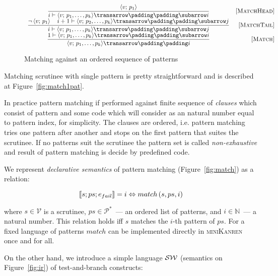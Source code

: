 \begin{figure}
   \renewcommand*{\arraystretch}{3}
   \setarrow{\xRightarrow}
   \setsubarrow{_*}
   \[
   \begin{array}{cr}
     \trule{\inbr{v;\,p_1}}
           {\withenv{i}{\trans{\inbr{v;\,p_1,\dots,p_k}}{}{i}}} & \ruleno{MatchHead}\\
     \trule{\neg\inbr{v;\,p_1}\quad\withenv{i+1}{\trans{\inbr{v;\,p_2,\dots,p_k}}{}{j}}}
           {\withenv{i}{\trans{\inbr{v;\,p_1,\dots,p_k}}{}{j}}} & \ruleno{MatchTail}\\
     \trule{\withenv{1}{\trans{\inbr{v;\,p_1,\dots,p_k}}{}{i}}}
           {\setsubarrow{}\trans{\inbr{v;\,p_1,\dots,p_k}}{}{i}} & \ruleno{Match}
   \end{array}
   \]
   \caption{Matching against an ordered sequence of patterns}
   \label{fig:matchpatts}
\end{figure}

Matching scrutinee with single pattern is pretty straightforward and is described at Figure~\ref{fig:match1pat}.

In practice pattern matching if performed against finite sequence of \emph{clauses} which consist of pattern and some code which will consider as an natural number equal to pattern index, for simplicity. The clauses are ordered, i.e. pattern matching tries one pattern after another and stops on the first pattern that suites the scrutinee. If no patterns suit the scrutinee the pattern set is called \emph{non-exhaustive} and result of pattern matching is decide by predefined code.   
 

We represent \emph{declarative semantics} of pattern matching (Figure~\ref{fig:match}) as a relation:
 
 \[
  \llbracket{s; ps; e_{fail}}\rrbracket = i \Leftrightarrow   match\, (s, ps, i)
 \]
 
 where $s\in\mathcal{V}$ is a scrutinee, $ps\in\mathcal{P}^*$~--- an ordered list of patterns, and $i\in\mathbb{N}$~--- a natural number.
 This relation holds iff $s$ matches the $i$-th pattern of $ps$. For a fixed language of patterns $match$ can be implemented directly
 in \textsc{miniKanren} once and for all.
 
 On the other hand, we introduce a simple language $\mathcal{S}\mathcal{W}$ (semantics on Figure~\ref{fig:ir}) of test-and-branch constructs:

